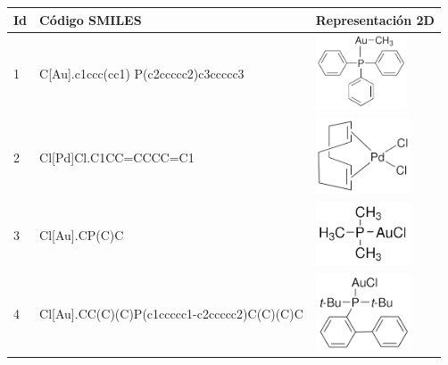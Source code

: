 \begin{landscape}
    \begin{table}
  \begin{minipage}{.5\linewidth}
    \centering
    \begin{tabular}{m{0.3cm}m{4.8cm}>{\centering\arraybackslash}m{4cm}}
        \toprule
        \textbf{Id} & \textbf{Código SMILES} & \textbf{Representación 2D} \\
        \midrule
        1 &
        C[Au].c1ccc(cc1) P(c2ccccc2)c3ccccc3 & \includegraphics[width=2.7cm]{imagenes/sigmaAldrich/Methyl(triphenylphosphine)gold(I)} \\ [0.8cm]

        2 &
        Cl[Pd]Cl.C1CC=CCCC=C1 & \includegraphics[width=2.8cm]{imagenes/sigmaAldrich/Dichloro(1,5-cyclooctadiene)palladium(II).png} \\ 
        
        3 &
        Cl[Au].CP(C)C & \includegraphics[width=2.8cm]{imagenes/sigmaAldrich/Chloro(trimethylphosphine)gold(I).png} \\ [0.8cm]

        4 &
        Cl[Au].CC(C)(C)P(c1ccccc1-c2ccccc2)C(C)(C)C & \includegraphics[width=2.8cm]{imagenes/sigmaAldrich/Chloro[(1,1-biphenyl-2-yl)di-tert-butylphosphine]gold(I).png} \\


\end{tabular}
\end{minipage}
\end{table}
\end{landscape}
